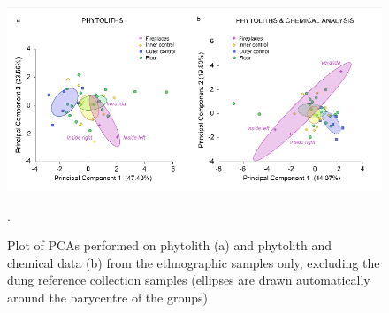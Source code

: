 \documentclass[authoryear,preprint,review,12pt]{elsarticle}
\begin{document}
\begin{figure}[ht!]
  \begin{center}
    \includegraphics[width=15cm]{figures/PCA}
    \caption{Plot of PCAs performed on phytolith (a) and phytolith and chemical data (b) from the ethnographic samples only, excluding the dung reference collection samples (ellipses are drawn automatically around the barycentre of the groups)}.
    \label{fig:PCA}
  \end{center}
\end{figure}
\end{document}
